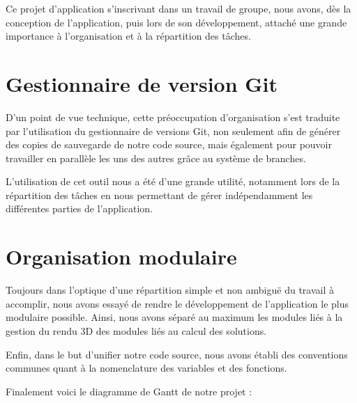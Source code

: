 Ce projet d'application s'inscrivant dans un travail de groupe, nous avons, dès la conception de l'application, puis lors de son développement, attaché une grande importance à l'organisation et à la répartition des tâches.

\section{Gestionnaire de version Git}
D'un point de vue technique, cette préoccupation d'organisation s'est traduite par l'utilisation du gestionnaire de versions Git, non seulement afin de générer des copies de sauvegarde de notre code source, mais également pour pouvoir travailler en parallèle les uns des autres grâce au système de branches.

L'utilisation de cet outil nous a été d'une grande utilité, notamment lors de la répartition des tâches en nous permettant de gérer indépendamment les différentes parties de l'application.

\section{Organisation modulaire}
Toujours dans l'optique d'une répartition simple et non ambiguë du travail à accomplir, nous avons essayé de rendre le développement de l'application le plus modulaire possible. Ainsi, nous avons séparé au maximum les modules liés à la gestion du rendu 3D des modules liés au calcul des solutions.

Enfin, dans le but d'unifier notre code source, nous avons établi des conventions communes quant à la nomenclature des variables et des fonctions.

Finalement voici le diagramme de Gantt de notre projet :

